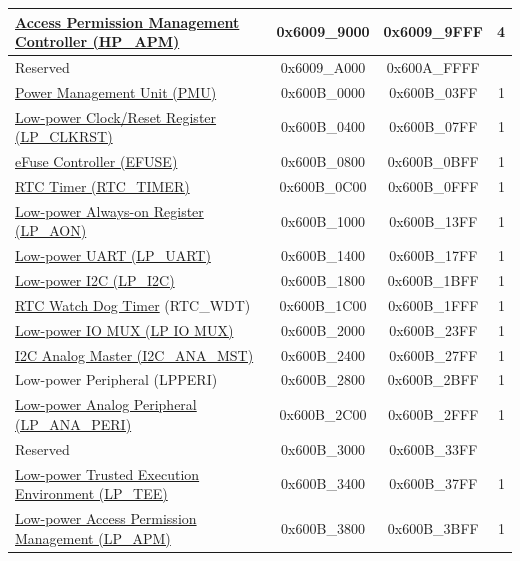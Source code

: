 \begin{ThreePartTable}
\begin{longtable}[c]{ |p{7cm}|c|c|r| }
\hyperref[mod:permctrl]{Access Permission Management Controller (HP\_APM)}\tnote{\textcolor{red}{*}}                      & 0x6009\_9000 & 0x6009\_9FFF &   4 \\\hline
    \rowcolor{gray!25}  Reserved                    & 0x6009\_A000 & 0x600A\_FFFF &         \\\hline
\hyperref[mod:lowpowm]{Power Management Unit (PMU)} & 0x600B\_0000 & 0x600B\_03FF &   1     \\\hline
\hyperref[mod:resclk]{Low-power Clock/Reset Register (LP\_CLKRST)}                  & 0x600B\_0400 & 0x600B\_07FF &   1     \\\hline
\hyperref[mod:efuse]{eFuse Controller (EFUSE)}                       & 0x600B\_0800 & 0x600B\_0BFF &   1     \\\hline
\hyperref[mod:lowpowm]{RTC Timer (RTC\_TIMER)}                   & 0x600B\_0C00 & 0x600B\_0FFF &   1     \\\hline
\hyperref[mod:lowpowm]{Low-power Always-on Register (LP\_AON)}                     & 0x600B\_1000 & 0x600B\_13FF &   1     \\\hline
\hyperref[mod:uart]{Low-power UART (LP\_UART)}                    & 0x600B\_1400 & 0x600B\_17FF &   1     \\\hline
\hyperref[mod:i2c]{Low-power I2C (LP\_I2C)}                     & 0x600B\_1800 & 0x600B\_1BFF &   1     \\\hline
\hyperref[mod:wdt]{RTC Watch Dog Timer} (RTC\_WDT)                     & 0x600B\_1C00 & 0x600B\_1FFF &   1     \\\hline
\hyperref[mod:iomuxgpio]{Low-power IO MUX (LP IO MUX)}                     & 0x600B\_2000 & 0x600B\_23FF &   1     \\\hline
\hyperref[mod:lowpowm]{I2C Analog Master (I2C\_ANA\_MST)}             & 0x600B\_2400 & 0x600B\_27FF &   1     \\\hline
Low-power Peripheral (LPPERI)                      & 0x600B\_2800 & 0x600B\_2BFF &   1     \\\hline
\hyperref[mod:lowpowm]{Low-power Analog Peripheral (LP\_ANA\_PERI)}               & 0x600B\_2C00 & 0x600B\_2FFF &   1     \\\hline
    \rowcolor{gray!25}  Reserved                    & 0x600B\_3000 & 0x600B\_33FF &         \\\hline
\hyperref[mod:permctrl]{Low-power Trusted Execution Environment (LP\_TEE)}\tnote{\textcolor{red}{*}}
& 0x600B\_3400 & 0x600B\_37FF &   1    \\\hline
\hyperref[mod:permctrl]{Low-power Access Permission Management (LP\_APM)}\tnote{\textcolor{red}{*}}                     & 0x600B\_3800 & 0x600B\_3BFF &   1     \\\hline

\end{longtable}
\end{ThreePartTable}
